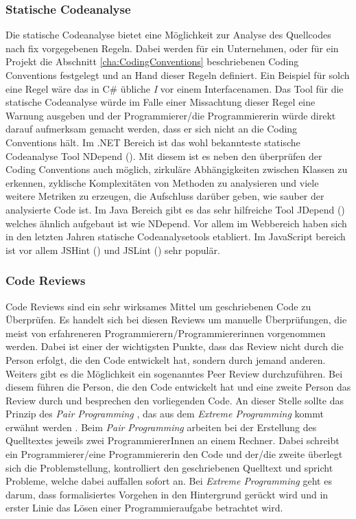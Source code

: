 \subsubsection{Statische Codeanalyse}
Die statische Codeanalyse bietet eine Möglichkeit zur Analyse des Quellcodes nach fix vorgegebenen Regeln. Dabei werden für ein Unternehmen, oder für ein Projekt die Abschnitt \ref{cha:CodingConventions} beschriebenen Coding Conventions festgelegt und an Hand dieser Regeln definiert. Ein Beispiel für solch eine Regel wäre das in C\# übliche \textit{I} vor einem Interfacenamen. Das Tool für die statische Codeanalyse würde im Falle einer Missachtung dieser Regel eine Warnung ausgeben und der Programmierer/die Programmiererin würde direkt darauf aufmerksam gemacht werden, dass er sich nicht an die Coding Conventions hält. Im .NET Bereich ist das wohl bekannteste statische Codeanalyse Tool NDepend (\cite{NDepend2016}). Mit diesem ist es neben den überprüfen der Coding Conventions auch möglich, zirkuläre Abhängigkeiten zwischen Klassen zu erkennen, zyklische Komplexitäten von Methoden zu analysieren und viele weitere Metriken zu erzeugen, die Aufschluss darüber geben, wie sauber der analysierte Code ist. Im Java Bereich gibt es das sehr hilfreiche Tool JDepend (\cite{JDepend2016}) welches ähnlich aufgebaut ist wie NDepend. Vor allem im Webbereich haben sich in den letzten Jahren statische Codeanalysetools etabliert. Im JavaScript bereich ist vor allem JSHint (\cite{JSHint2016})  und JSLint (\cite{JSLint2016}) sehr populär. 

\subsubsection{Code Reviews}
Code Reviews sind ein sehr wirksames Mittel um geschriebenen Code zu Überprüfen. Es handelt sich bei diesen Reviews um manuelle Überprüfungen, die meist von erfahreneren Programmierern/Programmiererinnen vorgenommen werden. Dabei ist einer der wichtigsten Punkte, dass das Review nicht durch die Person erfolgt, die den Code entwickelt hat, sondern durch jemand anderen. Weiters gibt es die Möglichkeit ein sogenanntes Peer Review durchzuführen. Bei diesem führen die Person, die den Code entwickelt hat und eine zweite Person das Review durch und besprechen den vorliegenden Code. An dieser Stelle sollte das Prinzip des \textit{Pair Programming} \cite{Pair2016}, das aus dem \textit{Extreme Programming} kommt erwähnt werden \cite{Beck2005}. Beim \textit{Pair Programming} arbeiten bei der Erstellung des Quelltextes jeweils zwei ProgrammiererInnen an einem Rechner. Dabei schreibt ein Programmierer/eine Programmiererin den Code und der/die zweite überlegt sich die Problemstellung, kontrolliert den geschriebenen Quelltext und spricht Probleme, welche dabei auffallen sofort an. Bei \textit{Extreme Programming} geht es darum, dass formalisiertes Vorgehen in den Hintergrund gerückt wird und in erster Linie das Lösen einer Programmieraufgabe betrachtet wird. 

